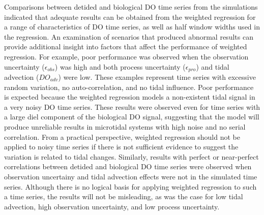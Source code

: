 Comparisons between detided and biological \ac{DO} time series from the simulations indicated that adequate results can be obtained from the weighted regression for a range of characteristics of \ac{DO} time series, as well as half window widths used in the regression.  An examination of scenarios that produced abnormal results can provide additional insight into factors that affect the performance of weighted regression.  For example, poor performance was observed when the observation uncertainty ($\epsilon_{obs}$) was high and both process uncertainty ($\epsilon_{pro}$) and tidal advection ($DO_{adv}$) were low.  These examples represent time series with excessive random variation, no auto-correlation, and no tidal influence.  Poor performance is expected because the weighted regression models a non-existent tidal signal in a very noisy \ac{DO} time series.  These results were observed even for time series with a large diel component of the biological \ac{DO} signal, suggesting that the model will produce unreliable results in microtidal systems with high noise and no serial correlation.  From a practical perspective, weighted regression should not be applied to noisy time series if there is not sufficient evidence to suggest the variation is related to tidal changes.  Similarly, results with perfect or near-perfect correlations between detided and biological \ac{DO} time series were observed when observation uncertainy and tidal advection effects were not in the simulated time series.  Although there is no logical basis for applying weighted regression to such a time series, the results will not be misleading, as was the case for low tidal advection, high observation uncertainty, and low process uncertainty.  

